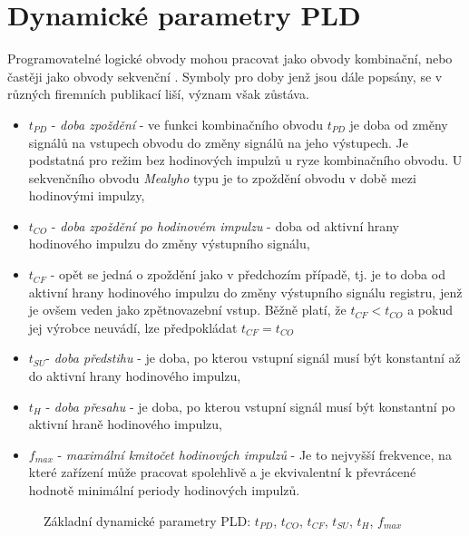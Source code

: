   \section{Dynamické parametry PLD}
     Programovatelné logické obvody mohou pracovat jako obvody kombinační, nebo častěji jako obvody
     sekvenční \cite[p~593]{Wakerly1999}. Symboly pro doby jenž jsou dále popsány, se v různých
     firemních publikací liší, význam však zůstáva.
    \begin{itemize}[noitemsep]
      \item $t_{PD}$ - \emph{doba zpoždění} - ve funkci kombinačního obvodu $t_{PD}$ je doba od
            změny signálů na vstupech obvodu do změny signálů na jeho výstupech. Je podstatná pro
            režim bez hodinových impulzů u ryze kombinačního  obvodu. U sekvenčního obvodu
            \emph{Mealyho} typu je to zpoždění obvodu v době mezi hodinovými impulzy,
      \item $t_{CO}$ - \emph{doba zpoždění po hodinovém impulzu} - doba od aktivní hrany hodinového
            impulzu do změny výstupního signálu,
      \item $t_{CF}$ - opět se jedná o zpoždění jako v předchozím případě, tj. je to doba od 
            aktivní hrany hodinového impulzu do změny výstupního signálu registru, jenž je ovšem 
            veden jako zpětnovazební vstup. Běžně platí, že $t_{CF}<t_{CO}$ a pokud
        jej výrobce neuvádí, lze předpokládat $t_{CF}=t_{CO}$
      \item $t_{SU}$- \emph{doba předstihu} - je doba, po kterou vstupní signál musí být 
            konstantní až do aktivní hrany hodinového impulzu,
      \item $t_{H}$ - \emph{doba přesahu} - je doba, po kterou vstupní signál musí být konstantní 
            po aktivní hraně hodinového impulzu,
      \item $f_{max}$ - \emph{maximální kmitočet hodinových impulzů} - Je to nejvyšší frekvence, 
            na které zařízení může pracovat spolehlivě a je ekvivalentní k převrácené hodnotě 
            minimální periody hodinových impulzů.
    \end{itemize}
    
    \begin{figure}[ht!]
      \centering
        {}                     \newline
        {}         \newline
      \subcaptionbox{                                                            \label{PLO:fig_PLD_timing_tcf}}
        {}           
      \caption{Základní dynamické parametry PLD: $t_{PD}$, $t_{CO}$, $t_{CF}$, $t_{SU}$,
               $t_{H}$, $f_{max}$}
      \label{PLO:fig_PLD_timing}
    \end{figure}  
        
